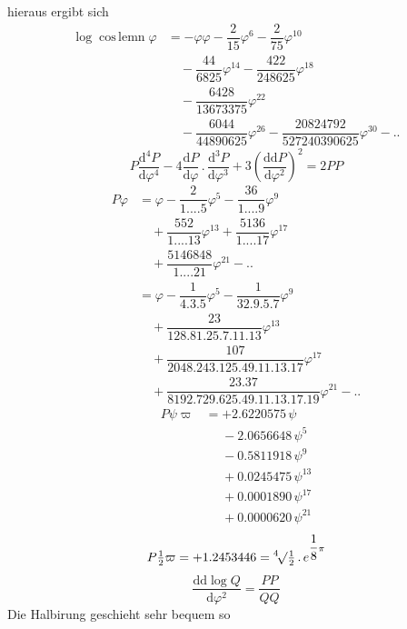 hieraus ergibt sich
\[
\begin{aligned}
\log\operatorname{cos\,lemn}\varphi
&=-\varphi\varphi-\dfrac2{15}\varphi^6-\dfrac2{75}\varphi^{10}
\\[6pt]&\quad{}-\dfrac{44}{6825}\varphi^{14}-\dfrac{422}{248625}\varphi^{18}
\\[6pt]&\quad{}-\dfrac{6428}{13673375}\varphi^{22}\\[6pt]
&\quad-\dfrac{6044}{44890625}\varphi^{26}
-\dfrac{20824792}{527240390625}\varphi^{30}-\mathord{.}\mathord{.}
\end{aligned}
\]
\[
P\dfrac{\mathrm d^4P}{\mathrm d\varphi^4}
-4\dfrac{\mathrm dP}{\mathrm d\varphi}\, .\,\dfrac{\mathrm d^3P}{\mathrm d\varphi^3}
+3\left(\dfrac{\mathrm d\mathrm dP}{\mathrm d\varphi^2}\right)^2=2PP
\]
\[
\begin{aligned}
P\varphi&=\varphi-\dfrac2{1\mathord{.}\mathord{.}\mathord{.}\mathord{.}5}\varphi^5
-\dfrac{36}{1\mathord{.}\mathord{.}\mathord{.}\mathord{.}9}\varphi^9
\\[6pt]&\quad{}+\dfrac{552}{1\mathord{.}\mathord{.}\mathord{.}\mathord{.}13}\varphi^{13}
+\dfrac{5136}{1\mathord{.}\mathord{.}\mathord{.}\mathord{.}17}\varphi^{17}
\\[6pt]&\quad{}+\dfrac{5146848}{1\mathord{.}\mathord{.}\mathord{.}\mathord{.}21}\varphi^{21}-\mathord{.}\mathord{.}\\[6pt]
&=\varphi-\dfrac1{4.3.5}\varphi^5-\dfrac1{32.9.5.7}\varphi^9
\\[6pt]&\quad{}+\dfrac{23}{128.81.25.7.11.13}\varphi^{13}
\\[6pt]&\quad{}+\dfrac{107}{2048.243.125.49.11.13.17}\varphi^{17}\\[6pt]
&\quad+\dfrac{23.37}{8192.729.625.49.11.13.17.19}\varphi^{21}-\mathord{.}\mathord{.}
\end{aligned}
\]
\[
\begin{aligned}
P\psi\varpi&=+2.6220575\,\psi\\
&\phantom{{}={}}-2.0656648\,\psi^5\\
&\phantom{{}={}}-0.5811918\,\psi^9\\
&\phantom{{}={}}+0.0245475\,\psi^{13}\\
&\phantom{{}={}}+0.0001890\,\psi^{17}\\
&\phantom{{}={}}+0.0000620\,\psi^{21}
\end{aligned}
\]
\[
P\tfrac12\varpi=+1.2453446
={}^{4}\!\surd\tfrac12\, .\,e^{\dfrac18\pi}
\]
\[
\dfrac{\mathrm d\mathrm d\log Q}{\mathrm d\varphi^2}=\dfrac{PP}{QQ}
\]
Die Halbirung geschieht sehr bequem so
